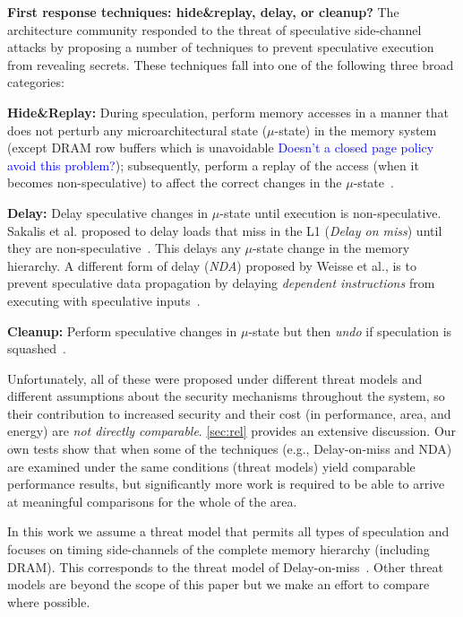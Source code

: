 \noindent \textbf{First response techniques: hide\&replay, delay, or cleanup?}
The architecture community responded to the threat of speculative side-channel attacks by proposing a number of techniques to prevent speculative execution from revealing secrets. These techniques fall into one of the following three broad categories:
%
\squishlist
\item{\textbf{Hide\&Replay:}} During speculation, perform memory accesses in a manner that does not perturb any microarchitectural state ($\mu$-state) in the memory system (except DRAM row buffers which is unavoidable \textcolor{blue}{Doesn't a closed page policy avoid this problem?}); subsequently, perform a replay of the access (when it becomes non-speculative) to affect the correct changes in the $\mu$-state~\cite{yan_invisispec:MICRO2018,sakalis2019ghost}. 

\item{\textbf{Delay:}} Delay speculative changes in $\mu$-state until execution is non-speculative. Sakalis et al. proposed to delay loads that miss in the L1 (\emph{Delay on miss}) until they are non-speculative~\cite{sakalis2019efficient}. This delays any $\mu$-state change in the memory hierarchy. A different form of delay (\emph{NDA}) proposed by Weisse et al., is to prevent speculative data propagation by delaying \emph{dependent instructions} from executing with speculative inputs~\cite{weisse2019nda}.

\item{\textbf{Cleanup:}} Perform speculative changes in $\mu$-state but then \emph{undo} if speculation is squashed~\cite{saileshwar2019cleanupspec}.
\squishend

Unfortunately, all of these were proposed under different threat models and different assumptions about the security mechanisms throughout the system, so their contribution to increased security and their cost (in performance, area, and energy) are \emph{not directly comparable}. \autoref{sec:rel} provides an extensive discussion. Our own tests show that when some of the techniques (e.g., Delay-on-miss and NDA) are examined under the same conditions (threat models) yield comparable performance results, but significantly more work is required to be able to arrive at meaningful comparisons for the whole of the area.

In this work we assume a threat model that permits all types of speculation and focuses on timing side-channels of the complete memory hierarchy (including DRAM). This corresponds to the threat model of 
Delay-on-miss~\cite{sakalis2019efficient}. Other threat models are beyond the scope of this paper {\color{red} but we make an effort to compare where possible}. %

